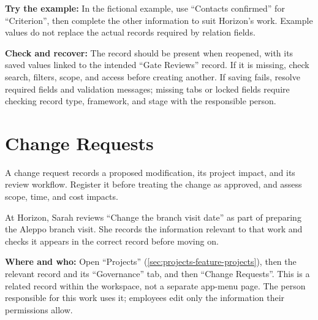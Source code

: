 \textbf{Try the example:} In the fictional example, use “Contacts confirmed” for “Criterion”, then complete the other information to suit Horizon's work. Example values do not replace the actual records required by relation fields.

\textbf{Check and recover:} The record should be present when reopened, with its saved values linked to the intended “Gate Reviews” record. If it is missing, check search, filters, scope, and access before creating another. If saving fails, resolve required fields and validation messages; missing tabs or locked fields require checking record type, framework, and stage with the responsible person.

\clearpage
\section{Change Requests}
\label{sec:projects-feature-change-requests}

A change request records a proposed modification, its project impact, and its review workflow. Register it before treating the change as approved, and assess scope, time, and cost impacts.

\begin{rcnote}
At Horizon, Sarah reviews “Change the branch visit date” as part of preparing the Aleppo branch visit. She records the information relevant to that work and checks it appears in the correct record before moving on.
\end{rcnote}

\textbf{Where and who:} Open “Projects” (\ref{sec:projects-feature-projects}), then the relevant record and its “Governance” tab, and then “Change Requests”. This is a related record within the workspace, not a separate app-menu page. The person responsible for this work uses it; employees edit only the information their permissions allow.

